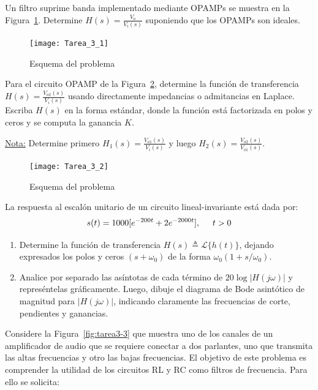 \documentclass[
  11pt,
  letterpaper,
   addpoints,
  ]{exam}
\begin{document}
\begin{questions}
    \question Un filtro suprime banda implementado mediante OPAMPs se muestra en la Figura~\ref{fig:suprime-banda}. Determine \( H(s) = \frac{V_o}{V_i(s)} \) suponiendo que los OPAMPs son ideales.
     
\begin{figure}[h!]
    \centering
    \texttt{[image: Tarea\_3\_1]}
    \caption{Esquema del problema}
    \label{fig:suprime-banda}
\end{figure}

    \question   Para el circuito OPAMP de la Figura~\ref{fig:tarea3-2}, determine la función de transferencia \( H(s) = \frac{V_{o2}(s)}{V_i(s)} \) usando directamente impedancias o admitancias en Laplace. Escriba \( H(s) \) en la forma estándar, donde la función está factorizada en polos y ceros y se computa la ganancia \( K \).

\underline{Nota:} Determine primero \( H_1(s) = \frac{V_{o1}(s)}{V_{i}(s)} \) y luego \( H_2(s) = \frac{V_{o2}(s)}{V_{o1}(s)} \).

\begin{figure}[h!]
    \centering
    \texttt{[image: Tarea\_3\_2]}
    \caption{Esquema del problema}
    \label{fig:tarea3-2}
\end{figure}
\question   La respuesta al escalón unitario de un circuito lineal-invariante está dada por:
    $$s(t) = 1000[e^{-200t} + 2e^{-2000t}], 
    \hspace{0.5cm}t>0$$
    \begin{enumerate}
        \item Determine la función de transferencia $H(s)\triangleq \mathcal{L}\{h(t)\}$, dejando expresados los polos y ceros $(s+\omega_0)$ de la forma $\omega_0(1+s/\omega_0)$.
        \item Analice por separado las asíntotas de cada término de $20\log|H(j\omega)|$ y represéntelas gráficamente. Luego, dibuje el diagrama de Bode asintótico de magnitud para $|H(j\omega)|$, indicando claramente las frecuencias de corte, pendientes y ganancias.
    \end{enumerate}
\question Considere la Figura~\ref{fig:tarea3-3} que muestra uno de los canales de un amplificador de audio que se requiere conectar a dos parlantes, uno que transmita las altas frecuencias y otro las bajas frecuencias. El objetivo de este problema es comprender la utilidad de los circuitos RL y RC como filtros de frecuencia. Para ello se solicita:


\end{questions}
\end{document}
